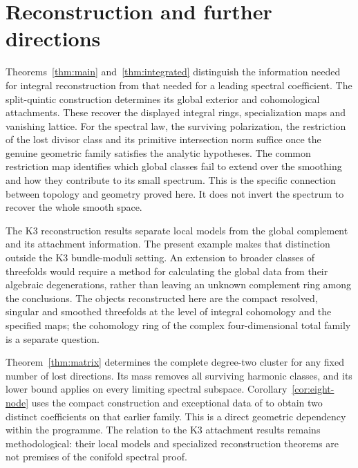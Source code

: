 \section{Reconstruction and further directions}\label{sec:further}

Theorems~\ref{thm:main} and~\ref{thm:integrated} distinguish the
information needed for integral reconstruction from that needed for a
leading spectral coefficient. The split-quintic construction determines
its global exterior and cohomological attachments. These recover the
displayed integral rings, specialization maps and vanishing lattice.
For the spectral law, the surviving polarization, the restriction of
the lost divisor class and its primitive intersection norm suffice
once the genuine geometric family satisfies the analytic hypotheses.
The common restriction map identifies which global classes fail to
extend over the smoothing and how they contribute to its small spectrum.
This is the specific connection between topology and geometry proved
here. It does not invert the spectrum to recover the whole smooth space.

The K3 reconstruction results
\cite{wuebben-reconstruction,wuebben-attachments} separate local models
from the global complement and its attachment information. The present
example makes that distinction outside the K3 bundle-moduli setting.
An extension to broader classes of threefolds would require a method for
calculating the global data from their algebraic degenerations, rather
than leaving an unknown complement ring among the conclusions. The
objects reconstructed here are the compact resolved, singular and
smoothed threefolds at the level of integral cohomology and the specified
maps; the cohomology ring of the complex four-dimensional total family
is a separate question.

Theorem~\ref{thm:matrix} determines the complete degree-two cluster for
any fixed number of lost directions. Its mass removes all surviving
harmonic classes, and its lower bound applies on every limiting spectral
subspace. Corollary~\ref{cor:eight-node} uses the compact construction
and exceptional data of \cite[Appendix~A, Proposition~A.1]{wuebben-chambers}
to obtain two distinct coefficients on that earlier family. This is a
direct geometric dependency within the programme. The relation to the
K3 attachment results remains methodological: their local models and
specialized reconstruction theorems are not premises of the conifold
spectral proof.

